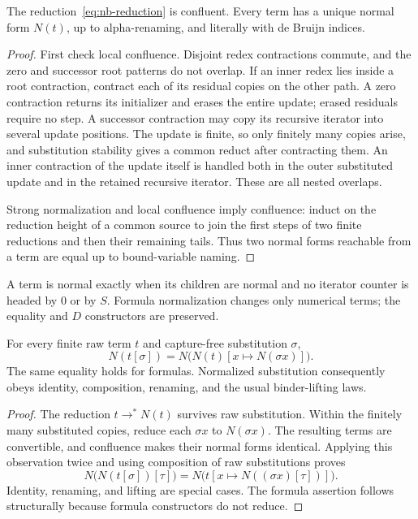 \begin{lemma}[Confluence]
\label{lem:nb-confluence}
The reduction~\eqref{eq:nb-reduction} is confluent. Every term has a unique
normal form $N(t)$, up to alpha-renaming, and literally with de Bruijn
indices.
\end{lemma}
\begin{proof}
First check local confluence. Disjoint redex contractions commute, and
the zero and successor root patterns do not overlap. If an inner redex
lies inside a root contraction, contract each of its residual copies on
the other path. A zero contraction returns its initializer and erases
the entire update; erased residuals require no step. A successor
contraction may copy its recursive iterator into
several update positions. The update is finite, so only finitely many
copies arise, and substitution stability gives a common reduct after
contracting them. An inner contraction of the update itself is handled
both in the outer substituted update and in the retained recursive
iterator. These are all nested overlaps.

Strong normalization and local confluence imply confluence: induct on
the reduction height of a common source to join the first steps of two
finite reductions and then their remaining tails. Thus two normal forms
reachable from a term are equal up to bound-variable naming.
\end{proof}

A term is normal exactly when its children are normal and no iterator
counter is headed by $0$ or by $S$. Formula normalization changes only
numerical terms; the equality and $D$ constructors are preserved.

\begin{lemma}[Coherence]
\label{lem:nb-coherence}
For every finite raw term $t$ and capture-free substitution $\sigma$,
\[
 N(t[\sigma])=
 N\bigl(N(t)[x\mapsto N(\sigma x)]\bigr).
 \tag{Coherence}\label{eq:nb-coherence}
\]
The same equality holds for formulas. Normalized substitution consequently
obeys identity, composition, renaming, and the usual binder-lifting laws.
\end{lemma}
\begin{proof}
The reduction $t\to^*N(t)$ survives raw substitution. Within the finitely
many substituted copies, reduce each $\sigma x$ to $N(\sigma x)$.
The resulting terms are convertible, and confluence makes their normal
forms identical. Applying this observation twice and using composition
of raw substitutions proves
\[
 N\bigl(N(t[\sigma])[\tau]\bigr)
   =N\bigl(t[x\mapsto N((\sigma x)[\tau])]\bigr).
\]
Identity, renaming, and lifting are special cases. The formula assertion
follows structurally because formula constructors do not reduce.
\end{proof}

